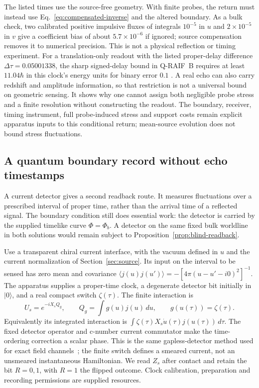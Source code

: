 The listed times use the source-free geometry. With finite probes, the return
must instead use Eq.~\eqref{eq:compensated-inverse} and the altered boundary.
As a bulk check, two calibrated positive impulsive fluxes of integrals
$10^{-5}$ in $u$ and $2\times10^{-5}$ in $v$ give a coefficient bias of about
$5.7\times10^{-6}$ if ignored; source compensation removes it to numerical
precision. This is not a physical reflection or timing experiment. For a
translation-only readout with the listed proper-delay difference
$\Delta\tau=0.05001338$, the sharp signed-delay bound in Q-RAIF~B requires
at least $11.04\hbar$ in this clock's energy units for binary error $0.1$
\cite{Liu2026QRAIFB}. A real echo can also carry redshift and amplitude information,
so that restriction is not a universal bound on geometric sensing. It shows why
one cannot assign both negligible probe stress and a finite resolution without
constructing the readout. The boundary, receiver, timing instrument, full
probe-induced stress and support costs remain explicit apparatus inputs to this
conditional return; mean-source evolution does not bound stress fluctuations.

\subsection{A quantum boundary record without echo timestamps}
\label{sec:boundary-current-sensor}

A current detector gives a second readback route. It measures fluctuations over
a prescribed interval of proper time, rather than the arrival time of a reflected
signal. The boundary condition still does essential work: the detector is carried
by the supplied timelike curve $\Phi=\Phi_b$. A detector on the same fixed bulk
worldline in both solutions would remain subject to
Proposition~\ref{prop:blind-readback}.

Use a transparent chiral current interface, with the vacuum defined in $u$ and
the current normalization of Section~\ref{sec:source}. Its input on the interval
to be sensed has zero mean and covariance
$\langle j(u)j(u')\rangle=-[4\pi(u-u'-i0)^2]^{-1}$. The apparatus supplies a
proper-time clock, a degenerate detector bit initially in $|0\rangle$, and a real
compact switch $\zeta(\tau)$. The finite interaction is
\begin{equation}\label{eq:boundary-sensor-unitary}
 U_s=e^{-iX_sQ_g},\qquad
 Q_g=\int g(u)j(u)\,du,\qquad
 g(u(\tau))=\zeta(\tau).
\end{equation}
Equivalently its integrated interaction is
$\int\zeta(\tau)X_s\dot u(\tau)j(u(\tau))\,d\tau$.
The fixed detector operator and c-number current commutator make the
time-ordering correction a scalar phase. This is the same gapless-detector
method used for exact field channels~\cite{Landulfo2016}; the finite switch
defines a smeared current, not an unsmeared instantaneous Hamiltonian.
We read $Z_s$ after contact and retain the bit $R=0,1$, with $R=1$ the flipped
outcome. Clock calibration, preparation and recording permissions are supplied
resources.

